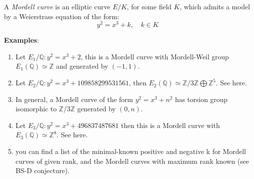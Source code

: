 \documentclass[12pt]{article}
\begin{document}
A \emph{Mordell curve} is an elliptic curve $E/K$, for some field
$K$, which admits a model by a Weierstrass equation of the form:
$$y^2=x^3+k,\quad k\in K$$

{\bf Examples}:
\begin{enumerate}
\item Let $E_1/\mathbb{Q}\colon y^2=x^3+2$, this is a Mordell
curve with Mordell-Weil group $E_1(\mathbb{Q})\simeq \mathbb{Z}$
and generated by $(-1,1)$.

\item Let $E_2/\mathbb{Q}\colon y^2=x^3+109858299531561$, then
$E_2(\mathbb{Q})\simeq \mathbb{Z}/3\mathbb{Z}\bigoplus
{\mathbb{Z}}^5$. See
here.

\item In general, a Mordell curve of the form $y^2=x^3+n^2$ has
torsion group isomorphic to $\mathbb{Z}/3\mathbb{Z}$ generated by
$(0,n)$.

\item Let $E_3/\mathbb{Q}\colon y^2=x^3+496837487681$ then this is
a Mordell curve with $E_3(\mathbb{Q})\simeq {\mathbb{Z}}^8$. See
here.

\item
{}
you can find a list of the minimal-known positive and negative k
for Mordell curves of given rank, and the Mordell curves with
maximum rank known (see BS-D conjecture).
\end{enumerate}
\end{document}
